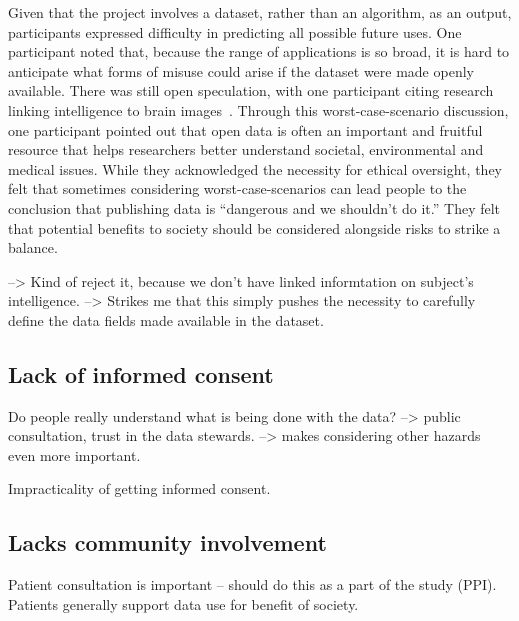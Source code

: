 \documentclass{article}
\begin{document}
Given that the project involves a dataset, rather than an algorithm,
as an output, participants expressed difficulty in
predicting all possible future uses. One participant noted that,
because the range of applications is so broad, it is hard to
anticipate what forms of misuse could arise if the dataset were made
openly available. There was still open speculation, with one
participant citing research linking intelligence to brain
images~\cite{dubois}. Through this worst-case-scenario discussion,
one participant pointed out that open data is often an important and
fruitful resource that helps researchers better understand societal,
environmental and medical issues. While they acknowledged the
necessity for ethical oversight, they felt that sometimes considering
worst-case-scenarios can lead people to the conclusion that publishing data
is ``dangerous and we shouldn't do it.'' They felt that potential
benefits to society should be considered alongside risks to strike a
balance. 

--> Kind of reject it, because we don't have linked informtation
  on subject's intelligence.
  --> Strikes me that this simply pushes the necessity to carefully
  define the data fields made available in the dataset.

  \subsection{Lack of informed consent}

 Do people really understand what is being done with the
  data?
  --> public consultation, trust in the data stewards.
  --> makes considering other hazards even more important.

 Impracticality of getting informed consent.

\subsection{Lacks community involvement}
 Patient consultation is important -- should do this as a part of
  the study (PPI).  
 Patients generally support data use for benefit of society.



\printbibliography
\end{document}

